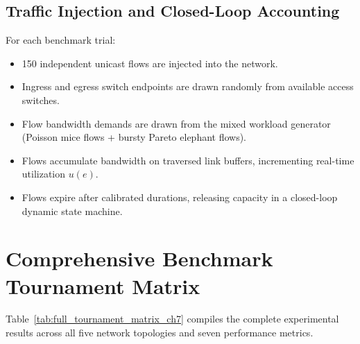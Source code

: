 \subsection{Traffic Injection and Closed-Loop Accounting}
For each benchmark trial:
\begin{itemize}
    \item 150 independent unicast flows are injected into the network.
    \item Ingress and egress switch endpoints are drawn randomly from available access switches.
    \item Flow bandwidth demands are drawn from the mixed workload generator (Poisson mice flows + bursty Pareto elephant flows).
    \item Flows accumulate bandwidth on traversed link buffers, incrementing real-time utilization $u(e)$.
    \item Flows expire after calibrated durations, releasing capacity in a closed-loop dynamic state machine.
\end{itemize}

\section{Comprehensive Benchmark Tournament Matrix}
Table~\ref{tab:full_tournament_matrix_ch7} compiles the complete experimental results across all five network topologies and seven performance metrics.


